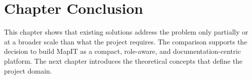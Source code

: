 \section{Chapter Conclusion}
This chapter shows that existing solutions address the problem only partially or at a broader scale than what the project requires. The comparison supports the decision to build MapIT as a compact, role-aware, and documentation-centric platform. The next chapter introduces the theoretical concepts that define the project domain.
